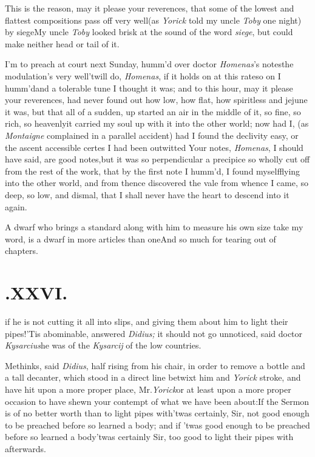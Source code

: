 \documentclass{article}
\begin{document}
\tsk This is the reason, may it please your reverences, that
some of the lowest and flattest compositions pass off
very\break
well\tsk (as \textit{Yorick} told my uncle \textit{Toby} one
night) by siege\tsk My uncle \textit{Toby} looked brisk at
the sound of the word \textit{siege}, but could make neither head or tail of
it.

I’m to preach at court next Sunday, 
humm’d over doctor \textit{Homenas}’s notes\tsk the
modulation’s very well\tsk ’twill do,
\textit{Homenas}, if it holds on at this rate\tsk so on I
humm’d\tsk and a tolerable tune I thought it was; and to
this hour, may it please your reverences, had never found
out how low, how flat, how spiritless and jejune it was, but
that all of a sudden, up started an air in the middle of it,
so fine, so rich, so heavenly\tsk it carried my soul up
with it into the other world; now had I, (as
\textit{Montaigne} complained in a parallel accident)\tsk
had I found the declivity easy, or the ascent accessible\tsk
certes I had been outwitted\break
\tsk Your notes, \textit{Homenas}, I should have said, are
good notes,\tsk but it was so per\-pendicular a precipice\tsk
so wholly cut off from the rest of the work, that by
the\break
first note I humm’d, I found myself\break flying into the other
world, and from thence discovered the vale from whence\break
I came, so deep, so low, and dismal,
that I shall never have
the heart to descend into it again.

\noindent
\fist A dwarf who brings a standard\break
along with him to measure his own size\break
\tsk take my word, is a dwarf in more articles than
one\tsk And so much for tearing out of chapters.

\bigskip

\section{.\enspace XXVI.}

if he is not cutting it all into slips, and giving them
about him to light their pipes!\tsh ’Tis abominable,
answered \textit{Didius;} it should not go unnoticed, said
doctor \textit{Kysarcius}\tsh \fist  he was of the
\textit{Kysarcij} of the low countries.

Methinks, said \textit{Didius}, half rising\break
from his chair, in order to remove a
bottle and a tall decanter, which stood in a direct line
betwixt him and \textit{Yorick}\break
{}
stroke, and have hit upon a more proper
place, Mr.\@ \textit{Yorick}\tsk or at least upon a more
proper occasion to have shewn your contempt of what we have
been about:\break If the Sermon is of no better worth than to
light pipes with\tsk ’twas certainly, Sir, not good enough
to be preached before so learned a body; and if ’twas good
enough to be preached before so learned a body\tsk ’twas
certainly Sir, too good to light their pipes with
afterwards.
\end{document}
